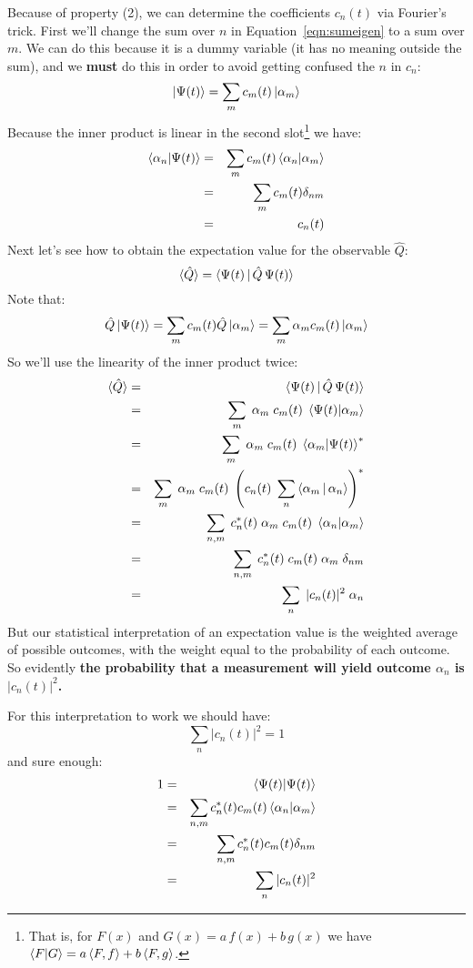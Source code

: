 \documentclass[12pt]{book}
\begin{document}
Because of property (2), we can determine the coefficients $c_n(t)$ via Fourier's trick. First
we'll change the sum over $n$ in Equation~\ref{eqn:sumeigen} to a sum over $m$.  We {\rm can} do this because it is a dummy variable (it has no meaning outside the sum), and we {\bf must} do this in order to avoid getting confused the $n$ in $c_n$:
$$\ket{\Psi(t)} = \sum_m c_m(t) \ket{\alpha_m}$$
Because the inner product is linear in the second slot\footnote{That is, for $F(x)$ and $G(x) = a\,f(x) + b\,g(x)$ we have $\braket{F|G} = a \braket{F,f} + b \braket{F,g}$.} we have:
\begin{eqnarray*}
\braket{\alpha_n| \Psi(t)} &=& \sum_m c_m(t) \braket{\alpha_n | \alpha_m}\\
 &=& \sum_m c_m(t) \delta_{nm}\\
 &=& c_n(t) \\
\end{eqnarray*}
Next let's see how to obtain the expectation value for the observable $\hat{Q}$:
$$\braket{\hat{Q}} = \braket{\Psi(t) \, | \, \hat{Q} \, \Psi(t)}$$
Note that:
$$\hat{Q}\ket{\Psi(t)} = \sum_m c_m(t) \hat{Q}\ket{\alpha_m} = \sum_m \alpha_m c_m(t) \ket{\alpha_m}$$
So we'll use the linearity of the inner product twice:
\begin{eqnarray*}
\braket{\hat{Q}} &=& \braket{\Psi(t) \, | \, \hat{Q} \, \Psi(t)} \\
&=& \sum_{m} \; \alpha_m \; c_m(t) \; \braket{\Psi(t) | \alpha_m} \\
&=& \sum_{m} \; \alpha_m \; c_m(t) \; \braket{\alpha_m | \Psi(t)}^*\\
&=& \sum_{m} \; \alpha_m \; c_m(t) \; \left( c_n(t) \; \sum_{n} \braket{\alpha_m \,|\, \alpha_n} \right)^*\\
&=& \sum_{n,m} \; c_n^*(t) \; \alpha_m \; c_m(t) \; \braket{\alpha_n | \alpha_m}\\
&=& \sum_{n,m} \; c_n^*(t) \; c_m(t) \; \alpha_m \; \delta_{nm}\\
&=& \sum_n \;|c_n(t)|^2 \; \alpha_n\\
\end{eqnarray*}
But our statistical interpretation of an expectation value is the weighted average of possible outcomes, with the weight equal to the probability of each outcome.  So evidently {\bf \boldmath the probability that a measurement will yield outcome $\alpha_n$ is $|c_n(t)|^2$.}

For this interpretation to work we should have:
$$\sum_n |c_n(t)|^2 = 1$$
and sure enough:
\begin{eqnarray*}
1 &=&\braket{\Psi(t) | \Psi(t)} \\
&=& \sum_{n,m} c_n^*(t) c_m(t) \braket{\alpha_n | \alpha_m}\\
&=& \sum_{n,m} c_n^*(t) c_m(t) \delta_{nm}\\
&=& \sum_n |c_n(t)|^2 \\ 
\end{eqnarray*}
\end{document}
